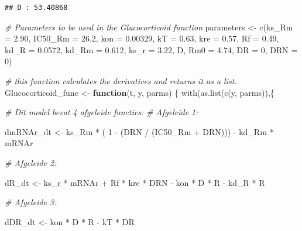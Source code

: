 \documentclass[
]{article}
\newenvironment{Shaded}{\begin{snugshade}}{\end{snugshade}}
\newcommand{\AttributeTok}[1]{\textcolor[rgb]{0.77,0.63,0.00}{#1}}
\newcommand{\CommentTok}[1]{\textcolor[rgb]{0.56,0.35,0.01}{\textit{#1}}}
\newcommand{\ControlFlowTok}[1]{\textcolor[rgb]{0.13,0.29,0.53}{\textbf{#1}}}
\newcommand{\DecValTok}[1]{\textcolor[rgb]{0.00,0.00,0.81}{#1}}
\newcommand{\FloatTok}[1]{\textcolor[rgb]{0.00,0.00,0.81}{#1}}
\newcommand{\FunctionTok}[1]{\textcolor[rgb]{0.00,0.00,0.00}{#1}}
\newcommand{\NormalTok}[1]{#1}
\newcommand{\OtherTok}[1]{\textcolor[rgb]{0.56,0.35,0.01}{#1}}
\newcommand{\SpecialCharTok}[1]{\textcolor[rgb]{0.00,0.00,0.00}{#1}}
\begin{document}
\begin{verbatim}
## D : 53.40868
\end{verbatim}

\begin{Shaded}
\begin{Highlighting}[]
\CommentTok{\# Parameters to be used in the Glucocorticoid function}
\NormalTok{parameters }\OtherTok{\textless{}{-}} \FunctionTok{c}\NormalTok{(}\AttributeTok{ks\_Rm =} \FloatTok{2.90}\NormalTok{, }\AttributeTok{IC50\_Rm =} \FloatTok{26.2}\NormalTok{, }\AttributeTok{kon =} \FloatTok{0.00329}\NormalTok{,}
                \AttributeTok{kT =} \FloatTok{0.63}\NormalTok{, }\AttributeTok{kre =} \FloatTok{0.57}\NormalTok{, }\AttributeTok{Rf =} \FloatTok{0.49}\NormalTok{, }\AttributeTok{kd\_R =} \FloatTok{0.0572}\NormalTok{,}
                \AttributeTok{kd\_Rm =} \FloatTok{0.612}\NormalTok{, }\AttributeTok{ks\_r =} \FloatTok{3.22}\NormalTok{, D, }\AttributeTok{Rm0 =} \FloatTok{4.74}\NormalTok{,}
                \AttributeTok{DR =} \DecValTok{0}\NormalTok{, }\AttributeTok{DRN =} \DecValTok{0}\NormalTok{)}

\CommentTok{\# this function calculates the derivatives and returns it as a list.}
\NormalTok{Glucocorticoid\_func }\OtherTok{\textless{}{-}} \ControlFlowTok{function}\NormalTok{(t, y, parms) \{}
    \FunctionTok{with}\NormalTok{(}\FunctionTok{as.list}\NormalTok{(}\FunctionTok{c}\NormalTok{(y, parms)),\{}
      
      \CommentTok{\# Dit model bevat 4 afgeleide functies:}
      \CommentTok{\# Afgeleide 1:}
  
\NormalTok{      dmRNAr\_dt }\OtherTok{\textless{}{-}}\NormalTok{ ks\_Rm }\SpecialCharTok{*}\NormalTok{ ( }\DecValTok{1} \SpecialCharTok{{-}}\NormalTok{ (DRN }\SpecialCharTok{/}\NormalTok{ (IC50\_Rm }\SpecialCharTok{+}\NormalTok{ DRN))) }\SpecialCharTok{{-}}\NormalTok{ kd\_Rm }\SpecialCharTok{*}\NormalTok{ mRNAr}
  
      \CommentTok{\# Afgeleide 2:}
  
\NormalTok{      dR\_dt }\OtherTok{\textless{}{-}}\NormalTok{ ks\_r }\SpecialCharTok{*}\NormalTok{ mRNAr }\SpecialCharTok{+}\NormalTok{ Rf }\SpecialCharTok{*}\NormalTok{ kre }\SpecialCharTok{*}\NormalTok{ DRN }\SpecialCharTok{{-}}\NormalTok{ kon }\SpecialCharTok{*}\NormalTok{ D }\SpecialCharTok{*}\NormalTok{ R }\SpecialCharTok{{-}}\NormalTok{ kd\_R }\SpecialCharTok{*}\NormalTok{ R}
      
      \CommentTok{\# Afgeleide 3:}
  
\NormalTok{      dDR\_dt }\OtherTok{\textless{}{-}}\NormalTok{ kon }\SpecialCharTok{*}\NormalTok{ D }\SpecialCharTok{*}\NormalTok{ R }\SpecialCharTok{{-}}\NormalTok{ kT }\SpecialCharTok{*}\NormalTok{ DR}
  

\end{Highlighting}
\end{Shaded}
\end{document}
